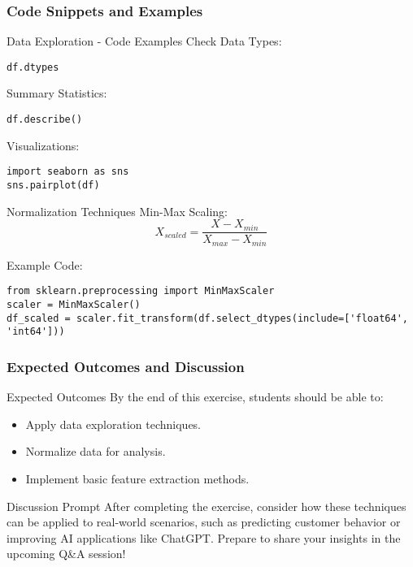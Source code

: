 \documentclass[aspectratio=169]{beamer}
\begin{document}
\begin{frame}[fragile]
    \frametitle{Code Snippets and Examples}
    \begin{block}{Data Exploration - Code Examples}
        Check Data Types:
        \begin{lstlisting}
df.dtypes
        \end{lstlisting}
        
        Summary Statistics:
        \begin{lstlisting}
df.describe()
        \end{lstlisting}
        
        Visualizations:
        \begin{lstlisting}
import seaborn as sns
sns.pairplot(df)
        \end{lstlisting}
    \end{block}

    \begin{block}{Normalization Techniques}
        Min-Max Scaling:
        \begin{equation}
        X_{scaled} = \frac{X - X_{min}}{X_{max} - X_{min}}
        \end{equation}

        Example Code:
        \begin{lstlisting}
from sklearn.preprocessing import MinMaxScaler
scaler = MinMaxScaler()
df_scaled = scaler.fit_transform(df.select_dtypes(include=['float64', 'int64']))
        \end{lstlisting}
    \end{block}
\end{frame}

\begin{frame}[fragile]
    \frametitle{Expected Outcomes and Discussion}
    \begin{block}{Expected Outcomes}
        By the end of this exercise, students should be able to:
        \begin{itemize}
            \item Apply data exploration techniques.
            \item Normalize data for analysis.
            \item Implement basic feature extraction methods.
        \end{itemize}
    \end{block}

    \begin{block}{Discussion Prompt}
        After completing the exercise, consider how these techniques can be applied to real-world scenarios, such as predicting customer behavior or improving AI applications like ChatGPT. Prepare to share your insights in the upcoming Q\&A session!
    \end{block}
\end{frame}
\end{document}
